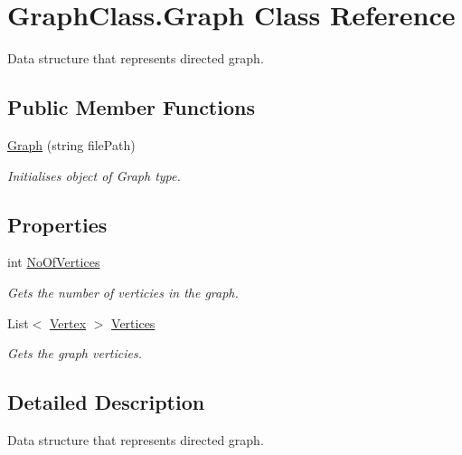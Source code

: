 \hypertarget{class_graph_class_1_1_graph}{}\section{Graph\+Class.\+Graph Class Reference}
\label{class_graph_class_1_1_graph}


Data structure that represents directed graph.  


\subsection*{Public Member Functions}
\begin{DoxyCompactItemize}
\item 
\hyperlink{class_graph_class_1_1_graph_a99c75a69fe22143921c24d631d30b8a3}{Graph} (string file\+Path)
\begin{DoxyCompactList}\small\item\em Initialises object of {\itshape Graph}  type. \end{DoxyCompactList}\end{DoxyCompactItemize}
\subsection*{Properties}
\begin{DoxyCompactItemize}
\item 
int \hyperlink{class_graph_class_1_1_graph_a4ab94cfad614e8e27dfcffa0bf9d49bf}{No\+Of\+Vertices}
\begin{DoxyCompactList}\small\item\em Gets the number of verticies in the graph. \end{DoxyCompactList}\item 
List$<$ \hyperlink{class_graph_class_1_1_vertex}{Vertex} $>$ \hyperlink{class_graph_class_1_1_graph_a64ccfced0142d5e513e422eb92008332}{Vertices}
\begin{DoxyCompactList}\small\item\em Gets the graph verticies. \end{DoxyCompactList}\end{DoxyCompactItemize}


\subsection{Detailed Description}
Data structure that represents directed graph. 



